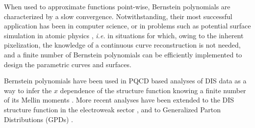 \documentclass[
twocolumn,
aps,prd,
nofootinbib,
superscriptaddress,
showpacs,ligh
tightenlines, 
]{revtex4}
\begin{document}
%
When used to approximate functions point-wise, Bernstein polynomials are characterized by a slow convergence. Notwithstanding, their most  successful application has been in computer science,
or in problems such as potential surface simulation in atomic physics \cite{HoRabitz}, {\it i.e.}  in situations for which, owing to the inherent pixelization, the knowledge of a continuous curve reconstruction is not needed, and a finite number of Bernstein polynomials can be efficiently implemented to design the parametric curves and surfaces. 

Bernstein polynomials have been used in PQCD based analyses 
of DIS data as a way to infer the $x$ dependence of the structure function knowing a finite number of its Mellin moments  \cite{Yndurain:1977wz,Pennington:1982kr,Santiago:1999pr,Santiago:2001mh}. 
More recent analyses have been extended to the DIS structure function in the electroweak sector \cite{Kataev:2001kk,Brooks:2006wh,Maxwell:2002mt}, and to Generalized Parton Distributions (GPDs)  \cite{Ahmad:2007vw}. 
\end{document}
